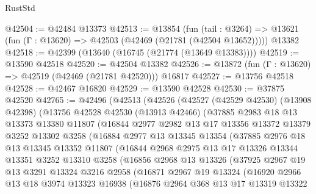 \begin{lexlean}{RustStd}
\begin{coremodule}
@42504 := @42484 @13373
@42513 := @13854
    (fun (tail : @3264) => @13621 (fun (Γ : @13620) => @42503 (@42469 (@21781 (@42504 @13652)))))
    @13382
@42518 := @42399 (@13640 (@16745 (@21774 (@13649 @13383))))
@42519 := @13590 @42518
@42520 := @42504 @13382
@42526 := @13872 (fun (Γ : @13620) => @42519 (@42469 (@21781 @42520))) @16817
@42527 := @13756 @42518
@42528 := @42467 @16820
@42529 := @13590 @42528
@42530 := @37875 @42520
@42765 := @42496
    (@42513
      (@42526
        (@42527
          (@42529 @42530)
          (@13908 @42398)
          (@13756
            @42528
            @42530
            (@13913 @42466)
            (@37885
              @2983
              @18
              @13
              @13373
              @13380
              @11807
              (@16844
                @2977
                @2982
                @13
                @17
                @13356
                @13372
                @13379
                @3252
                @13302
                @3258
                (@16884
                  @2977
                  @13
                  @13345
                  @13354
                  (@37885
                    @2976
                    @18
                    @13
                    @13345
                    @13352
                    @11807
                    (@16844
                      @2968
                      @2975
                      @13
                      @17
                      @13326
                      @13344
                      @13351
                      @3252
                      @13310
                      @3258
                      (@16856
                        @2968
                        @13
                        @13326
                        (@37925
                          @2967
                          @19
                          @13
                          @3291
                          @13324
                          @3216
                          @2958
                          (@16871
                            @2967
                            @19
                            @13324
                            (@16920
                              @2966
                              @13
                              @18
                              @3974
                              @13323
                              @16938
                              (@16876
                                @2964
                                @368
                                @13
                                @17
                                @13319
                                @13322

\end{coremodule}
\end{lexlean}
